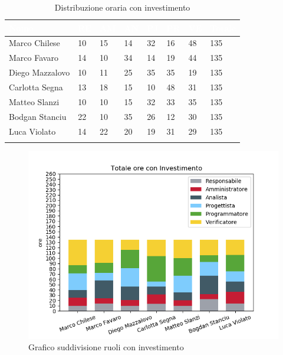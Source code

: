 \begin{longtable}{|C{.30\textwidth}|C{.06\textwidth}|C{.06\textwidth}|C{.06\textwidth} | C{.06\textwidth}| C{.06\textwidth} | C{.06\textwidth} | C{.10\textwidth} |}
\hline
{}	\textbf{\textcolor{white}{Nome}} & \textbf{\textcolor{white}{RE}} & \textbf{\textcolor{white}{AM}} & \textbf{\textcolor{white}{AN}} & \textbf{\textcolor{white}{PJ}} & \textbf{\textcolor{white}{PR}} & \textbf{\textcolor{white}{VE}} & \textbf{\textcolor{white}{Totale}}\\
\hline 
Marco Chilese & 10 & 15 & 14 & 32 & 16 & 48 & 135\\
\hline
{}Marco Favaro & 14 & 10 & 34 & 14 & 19 & 44 & 135\\
\hline
Diego Mazzalovo & 10 & 11 & 25 & 35 & 35 & 19 & 135\\
\hline
{}Carlotta Segna & 13 & 18 & 15 & 10 & 48 & 31 & 135\\
\hline
Matteo Slanzi & 10 & 10 & 15 & 32 & 33 & 35 & 135\\
\hline
{}Bodgan Stanciu & 22 & 10 & 35 & 26 & 12 & 30 & 135\\
\hline
Luca Violato & 14 & 22 & 20 & 19 & 31 & 29 & 135 \\
\hline


\caption{Distribuzione oraria con investimento}
\label{Distribuzione oraria delle ore con investimento}
\end{longtable}

\begin{figure}[H]
	\centering
  		\includegraphics[width=1\linewidth]{./images/fig_toi.png}
  		\caption{Grafico suddivisione ruoli con investimento}
  		\label{fig:grafico suddivione ruoli con investimento}
\end{figure}

